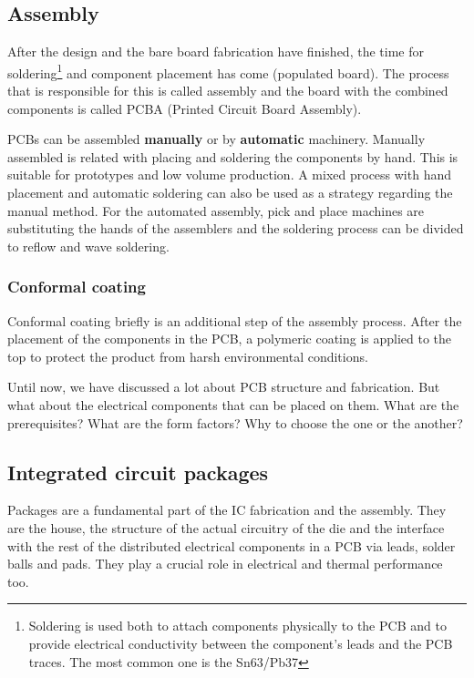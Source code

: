 \documentclass[final]{cubedoc}
\begin{document}
	
	\subsection{Assembly}
	
	After the design and the bare board fabrication have finished, the time for soldering\footnote{Soldering is used both to attach components physically to the PCB and to provide electrical conductivity between the component’s leads and the PCB traces. The most common one is the Sn63/Pb37} and component placement has come (populated board). The process that is responsible for this is called assembly and the board with the combined components is called PCBA (Printed Circuit Board Assembly).
	
	PCBs can be assembled \textbf{manually} or by \textbf{automatic} machinery. Manually assembled is related with placing and soldering the components by hand. This is suitable for prototypes and low volume production. A mixed process with hand placement and automatic soldering can also be used as a strategy regarding the manual method. For the automated assembly, pick and place machines are substituting the hands of the assemblers and the soldering process can be divided to reflow and wave soldering. 
	
	\subsubsection{Conformal coating}
	
	Conformal coating briefly is an additional step of the assembly process. After the placement of the components in the PCB, a polymeric coating is applied to the top to protect the product from harsh environmental conditions.
	
	Until now, we have discussed a lot about PCB structure and fabrication. But what about the electrical components that can be placed on them. What are the prerequisites? What are the form factors? Why to choose the one or the another?
	
	\subsection{Integrated circuit packages}
	
	Packages are a fundamental part of the IC fabrication and the assembly. They are the house, the structure of the actual circuitry of the die and the interface with the rest of the distributed electrical components in a PCB via leads, solder balls and pads. They play a crucial role in electrical and thermal performance too.
	
\end{document}
